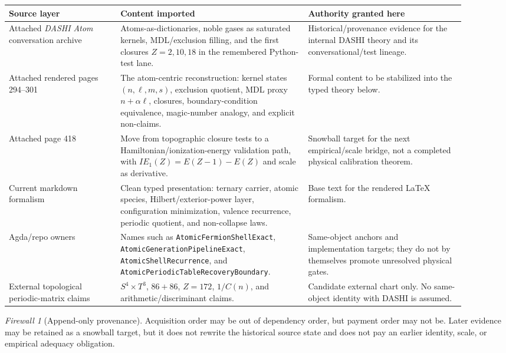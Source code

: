 \documentclass[11pt,a4paper]{article}
\theoremstyle{remark}
\newtheorem{firewall}[definition]{Firewall}
\begin{document}
\begin{longtable}{p{0.22\linewidth}p{0.37\linewidth}p{0.31\linewidth}}
\toprule
\textbf{Source layer} & \textbf{Content imported} & \textbf{Authority granted here}\\
\midrule
\endhead
Attached \emph{DASHI Atom} conversation archive & Atoms-as-dictionaries, noble gases as saturated kernels, MDL/exclusion filling, and the first closures $Z=2,10,18$ in the remembered Python-test lane. & Historical/provenance evidence for the internal DASHI theory and its conversational/test lineage.\\
Attached rendered pages 294--301 & The atom-centric reconstruction: kernel states $(n,\ell,m,s)$, exclusion quotient, MDL proxy $n+\alpha\ell$, closures, boundary-condition equivalence, magic-number analogy, and explicit non-claims. & Formal content to be stabilized into the typed theory below.\\
Attached page 418 & Move from topographic closure tests to a Hamiltonian/ionization-energy validation path, with $IE_1(Z)=E(Z-1)-E(Z)$ and scale as derivative. & Snowball target for the next empirical/scale bridge, not a completed physical calibration theorem.\\
Current markdown formalism & Clean typed presentation: ternary carrier, atomic species, Hilbert/exterior-power layer, configuration minimization, valence recurrence, periodic quotient, and non-collapse laws. & Base text for the rendered LaTeX formalism.\\
Agda/repo owners & Names such as \texttt{AtomicFermionShellExact}, \texttt{AtomicGenerationPipelineExact}, \texttt{AtomicShellRecurrence}, and \texttt{AtomicPeriodicTableRecoveryBoundary}. & Same-object anchors and implementation targets; they do not by themselves promote unresolved physical gates.\\
External topological periodic-matrix claims & $S^4\times T^3$, $86+86$, $Z=172$, $1/C(n)$, and arithmetic/discriminant claims. & Candidate external chart only.  No same-object identity with DASHI is assumed.\\
\bottomrule
\end{longtable}

\begin{firewall}[Append-only provenance]
Acquisition order may be out of dependency order, but payment order may not be.
Later evidence may be retained as a snowball target, but it does not rewrite the
historical source state and does not pay an earlier identity, scale, or empirical
adequacy obligation.
\end{firewall}
\end{document}
